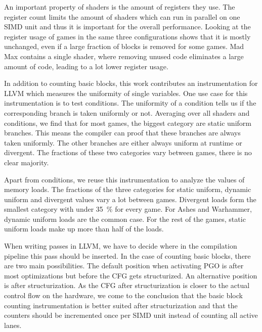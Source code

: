 An important property of shaders is the amount of registers they use.
The register count limits the amount of shaders which can run in parallel on one SIMD unit and thus it is important for the overall performance.
Looking at the register usage of games in the same three configurations shows that it is mostly unchanged, even if a large fraction of blocks is removed for some games.
Mad Max contains a single shader, where removing unused code eliminates a large amount of code, leading to a lot lower register usage.

In addition to counting basic blocks, this work contributes an instrumentation for LLVM which measures the uniformity of single variables.
One use case for this instrumentation is to test conditions.
The uniformity of a condition tells us if the corresponding branch is taken uniformly or not.
Averaging over all shaders and conditions, we find that for most games, the biggest category are static uniform branches.
This means the compiler can proof that these branches are always taken uniformly.
The other branches are either always uniform at runtime or divergent.
The fractions of these two categories vary between games, there is no clear majority.

Apart from conditions, we reuse this instrumentation to analyze the values of memory loads.
The fractions of the three categories for static uniform, dynamic uniform and divergent values vary a lot between games.
Divergent loads form the smallest category with under \SI{35}{\percent} for every game.
For Ashes and Warhammer, dynamic uniform loads are the common case.
For the rest of the games, static uniform loads make up more than half of the loads.

When writing passes in LLVM, we have to decide where in the compilation pipeline this pass should be inserted.
In the case of counting basic blocks, there are two main possibilities.
The default position when activating PGO is after most optimizations but before the CFG gets structurized.
An alternative position is after structurization.
As the CFG after structurization is closer to the actual control flow on the hardware, we come to the conclusion that the basic block counting instrumentation is better suited after structurization and that the counters should be incremented once per SIMD unit instead of counting all active lanes.
